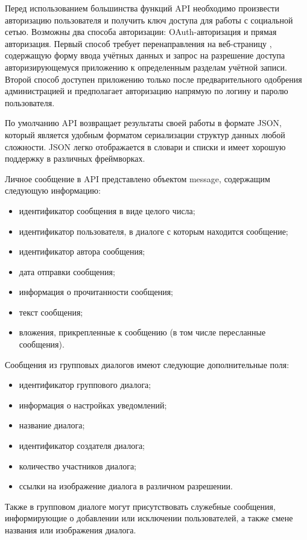 Перед использованием большинства функций API необходимо произвести авторизацию
пользователя и получить ключ доступа для работы с социальной сетью. Возможны два
способа авторизации: OAuth-авторизация и прямая авторизация.
Первый способ требует перенаправления на веб-страницу \vk{}, содержащую форму
ввода учётных данных и запрос на разрешение доступа авторизирующемуся приложению
к определенным разделам учётной записи. Второй способ доступен приложению только
после предварительного одобрения администрацией и предполагает авторизацию
напрямую по логину и паролю пользователя.

По умолчанию API возвращает результаты своей работы в формате JSON, который
является удобным форматом сериализации структур данных любой сложности. JSON
легко отображается в словари и списки и имеет хорошую поддержку в различных
фреймворках.

Личное сообщение в API \vk{} представлено объектом message,
содержащим следующую информацию:
\begin{itemize}
  \item идентификатор сообщения в виде целого числа;
  \item идентификатор пользователя, в диалоге с которым находится сообщение;
  \item идентификатор автора сообщения;
  \item дата отправки сообщения;
  \item информация о прочитанности сообщения;
  \item текст сообщения;
  \item вложения, прикрепленные к сообщению (в том числе пересланные сообщения).
\end{itemize}

Сообщения из групповых диалогов имеют следующие дополнительные поля:
\begin{itemize}
  \item идентификатор группового диалога;
  \item информация о настройках уведомлений;
  \item название диалога;
  \item идентификатор создателя диалога;
  \item количество участников диалога;
  \item ссылки на изображение диалога в различном разрешении.
\end{itemize}

Также в групповом диалоге могут присутствовать служебные сообщения,
информирующие о добавлении или исключении пользователей, а также смене названия
или изображения диалога.

